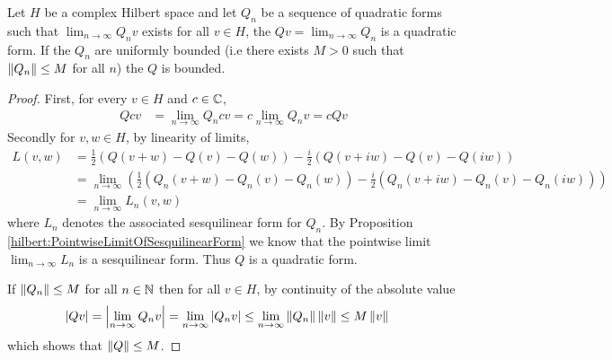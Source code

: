\begin{prop}\label{hilbert:PointwiseLimitOfQuadraticForm}Let $H$ be a complex Hilbert space and let $Q_n$ be a sequence of
  quadratic forms such that $\lim_{n\to \infty}Q_n v$ exists for all $v \in H$, the $Q v = \lim_{n \to \infty} Q_n$ is a quadratic form.
  If the $Q_n$ are uniformly bounded (i.e there exists $M > 0$ such that $\left \lVert Q_n \right \rVert \leq M$ for all $n$) the $Q$ is bounded.
\end{prop}
\begin{proof}
  First, for every $v \in H$ and $c \in \mathbb{C}$,
  \begin{align*}
    Q cv &= \lim_{n \to \infty} Q_n cv = c \lim_{n \to \infty} Q_n v = c Q v
  \end{align*}
  Secondly for $v,w \in H$, by linearity of limits,
  \begin{align*}
    L(v,w) &= \frac{1}{2} \left ( Q(v+w) - Q(v) - Q(w) \right) - \frac{i}{2} \left (Q(v+iw) - Q(v) - Q(iw) \right) \\
    &= \lim_{n \to \infty} \left( \frac{1}{2} \left ( Q_n(v+w) - Q_n(v) - Q_n(w) \right) - \frac{i}{2} \left (Q_n(v+iw) - Q_n(v) - Q_n(iw) \right) \right) \\
    &= \lim_{n \to \infty} L_n(v,w)
  \end{align*}
  where $L_n$ denotes the associated sesquilinear form for $Q_n$.   By Proposition \ref{hilbert:PointwiseLimitOfSesquilinearForm} we know that the
  pointwise limit $\lim_{n \to \infty} L_n$ is a sesquilinear form.   Thus $Q$ is a quadratic form.

  If $\left \lVert Q_n \right \rVert \leq M$ for all $n \in \mathbb{N}$ then for all $v \in H$, by continuity of the absolute value
  \begin{align*}
    \left \vert Qv \right \vert &= \left \vert \lim_{n \to \infty} Q_n v \right \vert = \lim_{n \to \infty}\left \vert  Q_n v \right \vert \leq \lim_{n \to \infty}\left \lVert  Q_n \right \rVert\left \lVert  v \right \rVert \leq M \left \lVert v \right \rVert
  \end{align*}
  which shows that $\left \lVert Q \right \rVert \leq M$.
\end{proof}

